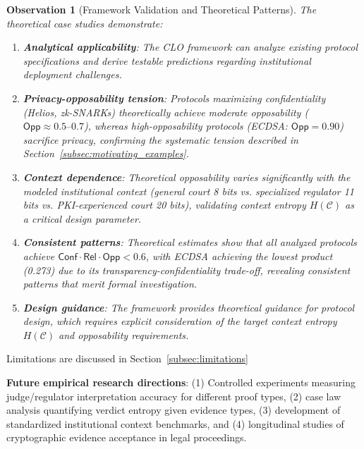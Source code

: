 \documentclass{ieeeaccess}
\newtheorem{observation}{Observation}[subsection]
\begin{document}
\begin{observation}[Framework Validation and Theoretical Patterns]
The theoretical case studies demonstrate:
\begin{enumerate}
\item \textbf{Analytical applicability}: The CLO framework can analyze existing protocol specifications and derive testable predictions regarding institutional deployment challenges.

\item \textbf{Privacy-opposability tension}: Protocols maximizing confidentiality (Helios, zk-SNARKs) theoretically achieve moderate opposability ($\mathsf{Opp} \approx 0.5\text{--}0.7$), whereas high-opposability protocols (ECDSA: $\mathsf{Opp}=0.90$) sacrifice privacy, confirming the systematic tension described in Section~\ref{subsec:motivating_examples}.

\item \textbf{Context dependence}: Theoretical opposability varies significantly with the modeled institutional context (general court 8 bits vs. specialized regulator 11 bits vs. PKI-experienced court 20 bits), validating context entropy $H(\mathcal{C})$ as a critical design parameter.

\item \textbf{Consistent patterns}: Theoretical estimates show that all analyzed protocols achieve $\mathsf{Conf} \cdot \mathsf{Rel} \cdot \mathsf{Opp} < 0.6$, with ECDSA achieving the lowest product (0.273) due to its transparency-confidentiality trade-off, revealing consistent patterns that merit formal investigation.

\item \textbf{Design guidance}: The framework provides theoretical guidance for protocol design, which requires explicit consideration of the target context entropy $H(\mathcal{C})$ and opposability requirements.
\end{enumerate}
\end{observation}

Limitations are discussed in Section~\ref{subsec:limitations}

\textbf{Future empirical research directions}: (1) Controlled experiments measuring judge/regulator interpretation accuracy for different proof types, (2) case law analysis quantifying verdict entropy given evidence types, (3) development of standardized institutional context benchmarks, and (4) longitudinal studies of cryptographic evidence acceptance in legal proceedings.
\end{document}
